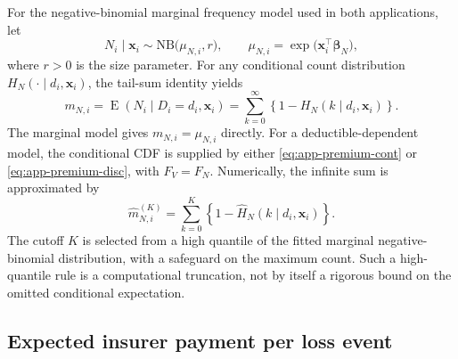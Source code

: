\documentclass[11pt]{article}
\begin{document}
{For the negative-binomial marginal frequency model used in both
applications, let
\begin{equation}
 N_i\mid\boldsymbol{x}_i\sim\mathrm{NB}\bigl(\mu_{N,i},r\bigr),
 \qquad \mu_{N,i}=\exp\bigl(\boldsymbol{x}_i^{\top}\boldsymbol\beta_N\bigr),
 \label{eq:app-premium-nb}
\end{equation}
where $r>0$ is the size parameter. For any conditional count distribution
$H_N(\cdot\mid d_i,\boldsymbol{x}_i)$, the tail-sum identity yields
\begin{equation}
 m_{N,i}=
 \operatorname{E}(N_i\mid D_i=d_i,\boldsymbol{x}_i)
 =\sum_{k=0}^{\infty}\left\{1-H_N(k\mid d_i,\boldsymbol{x}_i)\right\}.
 \label{eq:app-premium-freq}
\end{equation}
The marginal model gives $m_{N,i}=\mu_{N,i}$ directly. For a
deductible-dependent model, the conditional CDF is supplied by either
\eqref{eq:app-premium-cont} or \eqref{eq:app-premium-disc}, with
$F_V=F_N$. Numerically, the infinite sum is approximated by
\begin{equation}
 \widehat m_{N,i}^{(K)}
 =\sum_{k=0}^{K}\left\{1-\widehat H_N(k\mid d_i,\boldsymbol{x}_i)\right\}.
 \label{eq:app-premium-freq-num}
\end{equation}
The cutoff $K$ is selected from a high quantile of the fitted marginal
negative-binomial distribution, with a safeguard on the maximum count.
Such a high-quantile rule is a computational truncation, not by itself a
rigorous bound on the omitted conditional expectation.

\subsection{Expected insurer payment per loss event}
\label{app:premium-severity}

}
\end{document}
